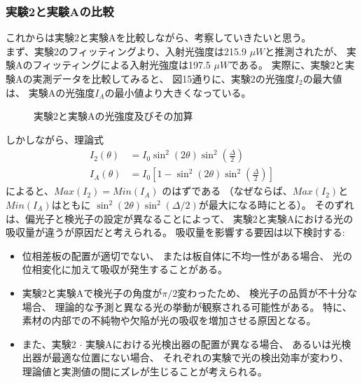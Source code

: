 \documentclass{article}
\begin{document}
\subsubsection*{実験2と実験Aの比較}
\begin{spacing}{1.2}
    これからは実験2と実験Aを比較しながら、考察していきたいと思う。\\
    \indent
    まず、実験2のフィッティングより、入射光強度は215.9 $\mu W$と推測されたが、
    実験Aのフィッティングによる入射光強度は197.5 $\mu W$である。
    実際に、実験2と実験Aの実測データを比較してみると、
    図15通りに、実験2の光強度$I_2$の最大値は、
    実験Aの光強度$I_A$の最小値より大きくなっている。
    \begin{figure}[!htb] %
        \centering
        \caption{実験2と実験Aの光強度及びその加算}
        \label{fig:15}
    \end{figure}
    \FloatBarrier
    \noindent
    しかしながら、理論式
    \begin{align}
        I_2(\theta) &= I_0 \sin^2(2\theta) \sin^2\left(\frac{\Delta}{2}\right)\\
        I_A(\theta) &= I_0 \left[ 1 - \sin^2(2\theta) \sin^2\left(\frac{\Delta}{2}\right) \right]
    \end{align}
    によると、$Max(I_2) = Min(I_A)$ のはずである
    （なぜならば、$Max(I_2)$と$Min(I_A)$はともに
    $\sin^2(2\theta) \sin^2\left(\Delta/2\right)$が最大になる時にとる）。
    そのずれは、偏光子と検光子の設定が異なることによって、
    実験2と実験Aにおける光の吸収量が違うが原因だと考えられる。
    吸収量を影響する要因は以下検討する:
    \begin{itemize}
        \item 位相差板の配置が適切でない、
        または板自体に不均一性がある場合、
        光の位相変化に加えて吸収が発生することがある。
        \item 実験2と実験Aで検光子の角度が$\pi/2$変わったため、
        検光子の品質が不十分な場合、
        理論的な予測と異なる光の挙動が観察される可能性がある。
        特に、素材の内部での不純物や欠陥が光の吸収を増加させる原因となる。
        \item また、実験2 $\cdot$ 実験Aにおける光検出器の配置が異なる場合、
        あるいは光検出器が最適な位置にない場合、
        それぞれの実験で光の検出効率が変わり、
        理論値と実測値の間にズレが生じることが考えられる。
    \end{itemize}


\end{spacing}
\end{document}
